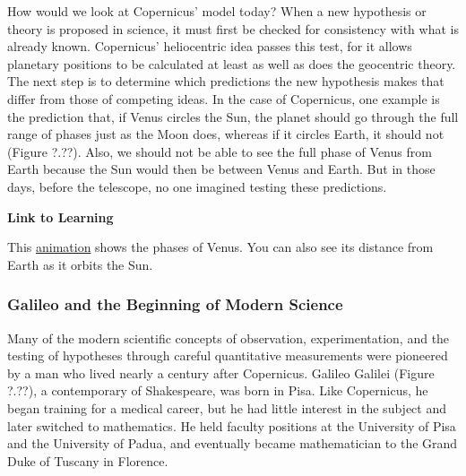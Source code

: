 \documentclass[../../main-astronomy.tex]{subfiles}
\begin{document}
\vspace{1em}

How would we look at Copernicus' model today? When a new hypothesis or theory is proposed in science, it must first be checked for consistency with what is already known. Copernicus' heliocentric idea passes this test, for it allows planetary positions to be calculated at least as well as does the geocentric theory. The next step is to determine which predictions the new hypothesis makes that differ from those of competing ideas. In the case of Copernicus, one example is the prediction that, if Venus circles the Sun, the planet should go through the full range of phases just as the Moon does, whereas if it circles Earth, it should not (Figure ?.??). Also, we should not be able to see the full phase of Venus from Earth because the Sun would then be between Venus and Earth. But in those days, before the telescope, no one imagined testing these predictions.

\vspace{1em}


\begin{mdframed}[backgroundcolor=black!10]
    \textbf{Link to Learning}

    \vspace{1ex}

    This \href{https://openstax.org/l/30venusphases}{animation} shows the phases of Venus. You can also see its distance from Earth as it orbits the Sun.
\end{mdframed}

\subsubsection*{Galileo and the Beginning of Modern Science}

Many of the modern scientific concepts of observation, experimentation, and the testing of hypotheses through careful quantitative measurements were pioneered by a man who lived nearly a century after Copernicus. Galileo Galilei (Figure ?.??), a contemporary of Shakespeare, was born in Pisa. Like Copernicus, he began training for a medical career, but he had little interest in the subject and later switched to mathematics. He held faculty positions at the University of Pisa and the University of Padua, and eventually became mathematician to the Grand Duke of Tuscany in Florence.

\vspace{1em} %
\end{document}
